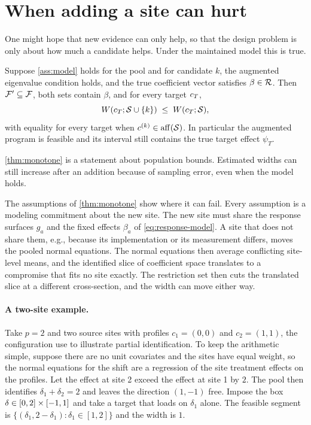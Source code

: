 \section{When adding a site can hurt}
\label{sec:monotonicity}

One might hope that new evidence can only help, so that the design
problem is only about how much a candidate helps. Under the maintained
model this is true.

\begin{theorem}
\label{thm:monotone}
Suppose \cref{ass:model} holds for the pool and for candidate $k$, the
augmented eigenvalue condition holds, and the true coefficient vector
satisfies $\beta\in\mathcal R$. Then $\mathcal F'\subseteq\mathcal F$, both
sets contain $\beta$, and for every target $c_T$,
\begin{equation}
  W(c_T;\mathcal S\cup\{k\})\;\leq\;W(c_T;\mathcal S),
  \label{eq:monotone}
\end{equation}
with equality for every target when $c^{(k)}\in\operatorname{aff}(\mathcal S)$. In
particular the augmented program is feasible and its interval still
contains the true target effect $\psi_T$.
\end{theorem}

\cref{thm:monotone} is a statement about population bounds. Estimated
widths can still increase after an addition because of sampling error,
even when the model holds.

The assumptions of \cref{thm:monotone} show where it can fail. Every
assumption is a modeling commitment about the new site. The new site
must share the response surfaces $g_a$ and the fixed effects $\beta_a$
of \eqref{eq:response-model}. A site that does not share them, e.g.,
because its implementation or its measurement differs, moves the pooled
normal equations. The normal equations then average conflicting
site-level means, and the identified slice of coefficient space
translates to a compromise that fits no site exactly. The restriction set then cuts the
translated slice at a different cross-section, and the width can move
either way.

\paragraph{A two-site example.}
Take $p=2$ and two source sites with profiles $c_1=(0,0)$ and
$c_2=(1,1)$, the configuration \citet{boyarsky2026} use to illustrate
partial identification. To keep the arithmetic simple, suppose there are
no unit covariates and the sites have equal weight, so the normal
equations for the shift are a regression of the site treatment effects
on the profiles. Let the effect at site 2 exceed the effect at site 1 by
$2$. The pool then identifies $\delta_1+\delta_2=2$ and leaves the
direction $(1,-1)$ free. Impose the box $\delta\in[0,2]\times[-1,1]$ and
take a target that loads on $\delta_1$ alone. The feasible segment is
$\{(\delta_1,2-\delta_1):\delta_1\in[1,2]\}$ and the width is $1$.

